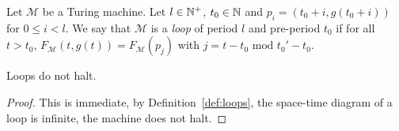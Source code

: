 



\begin{definition}[Loops]\label{def:loops}
    Let $\mathcal{M}$ be a Turing machine. Let $l\in\mathbb{N}^+$, $t_0 \in \mathbb{N}$ and $p_i = (t_0+i, g(t_0+i))$ for $0 \leq i < l$. We say that $\mathcal{M}$ is a \textit{loop} of period $l$ and pre-period $t_0$ if for all $t > t_0$, $F_\mathcal{M}(t,g(t)) = F_\mathcal{M}(p_j)$ with $j = t-t_0 \text{ mod } t_0' - t_0$.
\end{definition}

\begin{lemma}\label{lem:loopdonthalt}
    Loops do not halt.
\end{lemma}
\begin{proof} This is immediate, by Definition~\ref{def:loops}, the space-time diagram of a loop is infinite, the machine does not halt.
\end{proof}

\newpage


